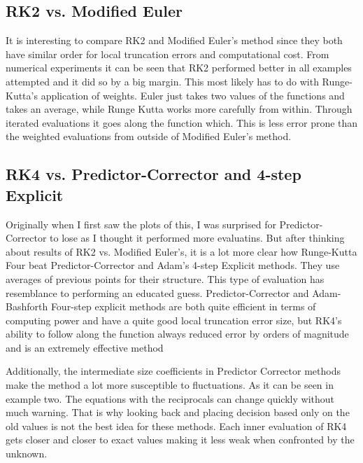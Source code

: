 \documentclass[11pt]{article}	%
\begin{document}
\subsection{RK2 vs. Modified Euler}
It is interesting to compare RK2 and Modified Euler's method since they both have similar order for local truncation errors and computational cost. From numerical experiments it can be seen that RK2 performed better in all examples attempted and it did so by a big margin. This most likely has to do with Runge-Kutta's application of weights. Euler just takes two values of the functions and takes an average, while Runge Kutta works more carefully from within. Through iterated evaluations it goes along the function which. This is less error prone than the weighted evaluations from outside of Modified Euler's method.


\subsection{RK4 vs. Predictor-Corrector and 4-step Explicit}

	Originally when I first saw the plots of this, I was surprised for Predictor-Corrector to lose as I thought it performed more evaluatins. But after thinking about results of RK2 vs. Modified Euler's, it is a lot more clear
how Runge-Kutta Four beat Predictor-Corrector and Adam's 4-step Explicit methods. They use averages of previous points for their structure. This type of evaluation has resemblance to performing an educated guess. Predictor-Corrector and Adam-Bashforth Four-step explicit methods are both quite efficient in terms of computing power and have a quite good local truncation error size, but RK4's ability to follow along the function always reduced error by orders of magnitude and is an extremely effective method

 Additionally, the intermediate size coefficients in Predictor Corrector methods make the method a lot more susceptible to fluctuations. As it can be seen in example two. The equations with the reciprocals can change quickly without much warning. That is why looking back and placing decision based only on the old values is not the best idea for these methods. Each inner evaluation of RK4 gets closer and closer to exact values making it less weak when confronted by the unknown.

\end{document}
